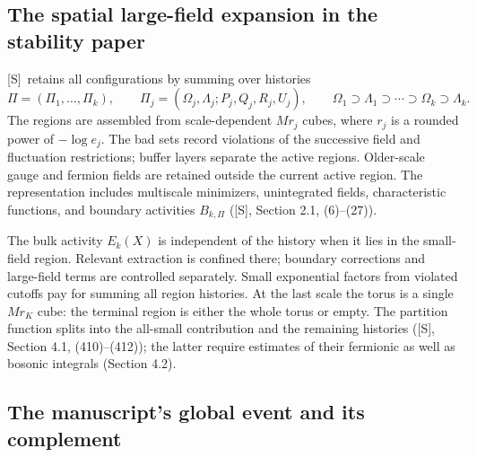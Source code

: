 \documentclass[11pt]{article}
\numberwithin{equation}{section}
\newcommand{\US}{\textup{[S]}}
\begin{document}
\subsection{The spatial large-field expansion in the stability paper}

\US\ retains all configurations by summing over histories
\begin{equation}
 \Pi=(\Pi_1,\ldots,\Pi_k),\qquad
 \Pi_j=(\Omega_j,\Lambda_j;P_j,Q_j,R_j,U_j),\qquad
 \Omega_1\supset\Lambda_1\supset\cdots\supset\Omega_k\supset\Lambda_k.
\end{equation}
The regions are assembled from scale-dependent $Mr_j$ cubes,
where $r_j$ is a rounded power of $-\log e_j$. The bad sets record
violations of the successive field and fluctuation restrictions;
buffer layers separate the active regions. Older-scale gauge and
fermion fields are retained outside the current active region.
The representation includes multiscale minimizers, unintegrated
fields, characteristic functions, and boundary activities $B_{k,\Pi}$
(\US, Section 2.1, (6)--(27)).

The bulk activity $E_k(X)$ is independent of the history when it lies
in the small-field region. Relevant extraction is confined there;
boundary corrections and large-field terms are controlled separately.
Small exponential factors from violated cutoffs pay for summing all
region histories. At the last scale the torus is a single $Mr_K$ cube:
the terminal region is either the whole torus or empty. The partition
function splits into the all-small contribution and the remaining
histories (\US, Section 4.1, (410)--(412)); the latter require estimates
of their fermionic as well as bosonic integrals (Section 4.2).

\subsection{The manuscript's global event and its complement}
\end{document}
